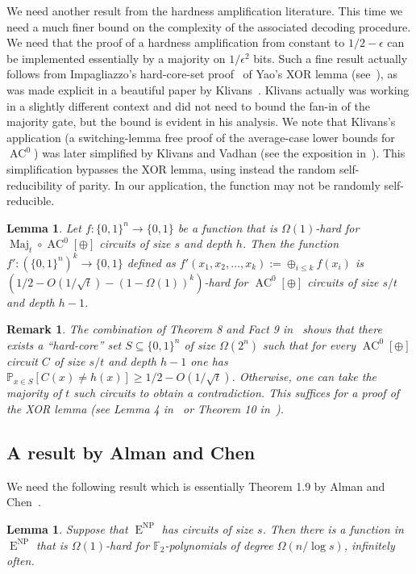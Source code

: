 \documentclass{toc}
\newtheorem{rem}[theorem]{Remark}   %
\newtheorem{lem}[theorem]{Lemma}  %
\DeclareMathOperator{\Maj}{\mathrm{Maj}}  %
\DeclareMathOperator{\AC}{\mathrm{AC}}  %
\DeclareMathOperator{\NP}{\mathrm{NP}}  %
\DeclareMathOperator{\EEE}{\mathrm{E}}  %
\newcommand{\zo}{\{0, 1\}}
\newcommand{\F}{\mathbb{F}}
\renewcommand{\P}{\mathbb{P}}
\newcommand{\e}{\epsilon}
\begin{document}
We need another result from the hardness amplification literature.
This time we need a much finer bound on the complexity of the associated
decoding procedure. We need that the proof of a hardness amplification
from constant to $1/2-\e$ can be implemented essentially by a majority
on $1/\e^{2}$ bits. Such a fine result actually follows from Impagliazzo's
hard-core-set proof~\cite{Imp95} of Yao's XOR lemma (see~\cite{GNW95}),
as was made explicit in a beautiful paper by Klivans~\cite{Kli01}.
Klivans actually was working in a slightly different context and did
not need to bound the fan-in of the majority gate, but the bound is
evident in his analysis. We note that %
Klivans's   %
application (a switching-lemma
free proof of the average-case lower bounds for $\AC^{0}$) was later
simplified by Klivans and Vadhan (see the exposition in~\cite{viola-FTTCS09}).
This simplification bypasses the XOR lemma, using instead the random
self-reducibility of parity. In our application, the function may
not be randomly self-reducible.
\begin{lem}
\label{lem:Klivans}Let $f:\zo^{n}\to\zo$ be a function that is $\Omega(1)$-hard
for $\Maj_{t}\circ \AC^{0}[\oplus]$ circuits of size $s$ and depth
$h$. Then the function $f':(\zo^{n})^{k}\to\zo$ defined as $f'(x_{1},x_{2},\ldots,x_{k}):=\oplus_{i\le k}f(x_{i})$
is $(1/2-O(1/\sqrt{t})-(1-\Omega(1))^{k})$-hard for $\AC^{0}[\oplus]$
circuits of size $s/t$ and depth $h-1$.
\end{lem}

\begin{rem}
The combination of Theorem 8 and Fact 9 in~\cite{Kli01} shows that
there exists a ``hard-core'' set $S\subseteq\zo^{n}$ of size $\Omega(2^{n})$
such that for every $\AC^{0}[\oplus]$ circuit $C$ of size $s/t$
and depth $h-1$ one has $\P_{x\in S}[C(x)\ne h(x)]\ge1/2-O(1/\sqrt{t})$.
Otherwise, one can take the majority of $t$ such circuits to obtain
a contradiction. This suffices for a proof of the XOR lemma (see Lemma
4 in~\cite{Imp95} or Theorem 10 in~\cite{Kli01}).
\end{rem}


\subsection{A result by Alman and Chen}

We need the following result which is essentially Theorem 1.9 by Alman
and Chen~\cite{AlmanC19}.
\begin{lem}
\label{lem:stronger-AlmanChen-Conditional-1} Suppose that $\EEE^{\NP}$
has circuits of size $s$. Then there is a function in $\EEE^{\NP}$ that
is $\Omega(1)$-hard for $\F_{2}$-polynomials of degree $\Omega(n/\log s)$,
infinitely often.
\end{lem}
\end{document}
